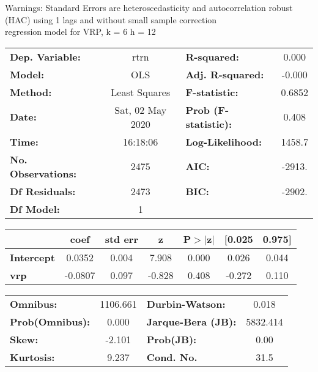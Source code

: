 Warnings: \newline
 [1] Standard Errors are heteroscedasticity and autocorrelation robust (HAC) using 1 lags and without small sample correction\\ 

regression model for VRP, k = 6 h = 12\begin{center}
\begin{tabular}{lclc}
\toprule
\textbf{Dep. Variable:}    &       rtrn       & \textbf{  R-squared:         } &     0.000   \\
\textbf{Model:}            &       OLS        & \textbf{  Adj. R-squared:    } &    -0.000   \\
\textbf{Method:}           &  Least Squares   & \textbf{  F-statistic:       } &    0.6852   \\
\textbf{Date:}             & Sat, 02 May 2020 & \textbf{  Prob (F-statistic):} &    0.408    \\
\textbf{Time:}             &     16:18:06     & \textbf{  Log-Likelihood:    } &    1458.7   \\
\textbf{No. Observations:} &        2475      & \textbf{  AIC:               } &    -2913.   \\
\textbf{Df Residuals:}     &        2473      & \textbf{  BIC:               } &    -2902.   \\
\textbf{Df Model:}         &           1      & \textbf{                     } &             \\
\bottomrule
\end{tabular}
\begin{tabular}{lcccccc}
                   & \textbf{coef} & \textbf{std err} & \textbf{z} & \textbf{P$> |$z$|$} & \textbf{[0.025} & \textbf{0.975]}  \\
\midrule
\textbf{Intercept} &       0.0352  &        0.004     &     7.908  &         0.000        &        0.026    &        0.044     \\
\textbf{vrp}       &      -0.0807  &        0.097     &    -0.828  &         0.408        &       -0.272    &        0.110     \\
\bottomrule
\end{tabular}
\begin{tabular}{lclc}
\textbf{Omnibus:}       & 1106.661 & \textbf{  Durbin-Watson:     } &    0.018  \\
\textbf{Prob(Omnibus):} &   0.000  & \textbf{  Jarque-Bera (JB):  } & 5832.414  \\
\textbf{Skew:}          &  -2.101  & \textbf{  Prob(JB):          } &     0.00  \\
\textbf{Kurtosis:}      &   9.237  & \textbf{  Cond. No.          } &     31.5  \\
\bottomrule
\end{tabular}
\end{center}

